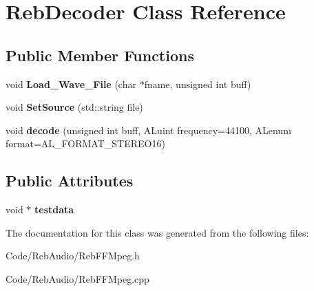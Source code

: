 \hypertarget{class_reb_decoder}{}\section{Reb\+Decoder Class Reference}
\label{class_reb_decoder}
\subsection*{Public Member Functions}
\begin{DoxyCompactItemize}
\item 
void {\bfseries Load\+\_\+\+Wave\+\_\+\+File} (char $\ast$fname, unsigned int buff)\hypertarget{class_reb_decoder_a1bbe36c40cba91d0da261f016a26300d}{}\label{class_reb_decoder_a1bbe36c40cba91d0da261f016a26300d}

\item 
void {\bfseries Set\+Source} (std\+::string file)\hypertarget{class_reb_decoder_a9afc17a880a5fededbbaa6c90c1e05be}{}\label{class_reb_decoder_a9afc17a880a5fededbbaa6c90c1e05be}

\item 
void {\bfseries decode} (unsigned int buff, A\+Luint frequency=44100, A\+Lenum format=A\+L\+\_\+\+F\+O\+R\+M\+A\+T\+\_\+\+S\+T\+E\+R\+E\+O16)\hypertarget{class_reb_decoder_acddf0e5ad5b6f43cbd4de4553f091daa}{}\label{class_reb_decoder_acddf0e5ad5b6f43cbd4de4553f091daa}

\end{DoxyCompactItemize}
\subsection*{Public Attributes}
\begin{DoxyCompactItemize}
\item 
void $\ast$ {\bfseries testdata}\hypertarget{class_reb_decoder_a1bc0585c00154bf8afbf0f32a025795a}{}\label{class_reb_decoder_a1bc0585c00154bf8afbf0f32a025795a}

\end{DoxyCompactItemize}


The documentation for this class was generated from the following files\+:\begin{DoxyCompactItemize}
\item 
Code/\+Reb\+Audio/Reb\+F\+F\+Mpeg.\+h\item 
Code/\+Reb\+Audio/Reb\+F\+F\+Mpeg.\+cpp\end{DoxyCompactItemize}
